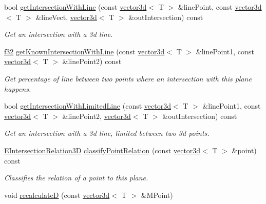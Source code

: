 \begin{DoxyCompactItemize}
\item 
bool \hyperlink{classirr_1_1core_1_1plane3d_a81c6fd667e7018805f9fb388721e2f30}{get\+Intersection\+With\+Line} (const \hyperlink{classirr_1_1core_1_1vector3d}{vector3d}$<$ T $>$ \&line\+Point, const \hyperlink{classirr_1_1core_1_1vector3d}{vector3d}$<$ T $>$ \&line\+Vect, \hyperlink{classirr_1_1core_1_1vector3d}{vector3d}$<$ T $>$ \&out\+Intersection) const 
\begin{DoxyCompactList}\small\item\em Get an intersection with a 3d line. \end{DoxyCompactList}\item 
\hyperlink{namespaceirr_a0277be98d67dc26ff93b1a6a1d086b07}{f32} \hyperlink{classirr_1_1core_1_1plane3d_a572803fab72c142ad186b364da3193cb}{get\+Known\+Intersection\+With\+Line} (const \hyperlink{classirr_1_1core_1_1vector3d}{vector3d}$<$ T $>$ \&line\+Point1, const \hyperlink{classirr_1_1core_1_1vector3d}{vector3d}$<$ T $>$ \&line\+Point2) const 
\begin{DoxyCompactList}\small\item\em Get percentage of line between two points where an intersection with this plane happens. \end{DoxyCompactList}\item 
bool \hyperlink{classirr_1_1core_1_1plane3d_a9da6378730742e46bd1e73624b048641}{get\+Intersection\+With\+Limited\+Line} (const \hyperlink{classirr_1_1core_1_1vector3d}{vector3d}$<$ T $>$ \&line\+Point1, const \hyperlink{classirr_1_1core_1_1vector3d}{vector3d}$<$ T $>$ \&line\+Point2, \hyperlink{classirr_1_1core_1_1vector3d}{vector3d}$<$ T $>$ \&out\+Intersection) const 
\begin{DoxyCompactList}\small\item\em Get an intersection with a 3d line, limited between two 3d points. \end{DoxyCompactList}\item 
\hyperlink{namespaceirr_1_1core_a8a9999eb0d151083f48afe5f7d17a96c}{E\+Intersection\+Relation3D} \hyperlink{classirr_1_1core_1_1plane3d_a0ef82b15cefb92fc8a1a93f2465c95cb}{classify\+Point\+Relation} (const \hyperlink{classirr_1_1core_1_1vector3d}{vector3d}$<$ T $>$ \&point) const 
\begin{DoxyCompactList}\small\item\em Classifies the relation of a point to this plane. \end{DoxyCompactList}\item 
void \hyperlink{classirr_1_1core_1_1plane3d_a65c1748d516ddc820b6b970f9367f1ff}{recalculateD} (const \hyperlink{classirr_1_1core_1_1vector3d}{vector3d}$<$ T $>$ \&M\+Point)\hypertarget{classirr_1_1core_1_1plane3d_a65c1748d516ddc820b6b970f9367f1ff}{}\label{classirr_1_1core_1_1plane3d_a65c1748d516ddc820b6b970f9367f1ff}


\end{DoxyCompactItemize}
